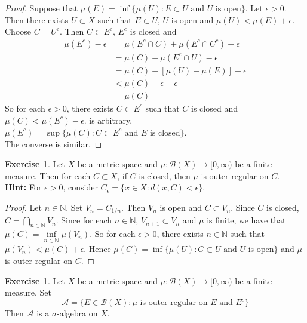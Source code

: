 \documentclass[12pt]{amsart}
\theoremstyle{definition}
\newtheorem{ex}[definition]{Exercise}
\newcommand{\ep}{\epsilon}
\newcommand{\sig}{\sigma}
\newcommand{\N}{\mathbb{N}}
\newcommand{\MA}{\mathcal{A}}
\newcommand{\MB}{\mathcal{B}}
\newcommand{\Rg}{[0,\infty)}
\begin{document}
	\begin{proof}
		Suppose that $\mu(E) = \inf  \{\mu(U): E \subset U \text{ and $U$ is open} \}$. Let $\ep >0$. Then there exists $U \subset X$ such that $E \subset U$, $U$ is open and $\mu(U) < \mu(E) + \ep$. Choose $C = U^c$. Then $C \subset E^c$, $E^c$ is closed and 
		\begin{align*}
			\mu(E^c) - \ep 
			&= \mu(E^c \cap C) + \mu(E^c \cap C^c) - \ep \\
			&= \mu(C) + \mu(E^c \cap U) - \ep \\
			&= \mu(C) + [\mu(U) - \mu(E)] - \ep \\
			&< \mu(C) + \ep - \ep \\
			&= \mu(C)
		\end{align*}
		So for each $\ep > 0$, there exists $C \subset E^c$ such that $C$ is closed and $\mu(C) < \mu(E^c) - \ep$. is arbitrary, $\mu(E^c) = \sup\{\mu(C): C \subset E^c \text{ and $E$ is closed}\}$. \\
		The converse is similar. 
	\end{proof}

	\begin{ex}
		Let $X$ be a metric space and $\mu: \MB(X) \rightarrow \Rg$ be a finite measure. Then for each $C \subset X$, if $C$ is closed, then $\mu$ is outer regular on $C$. \\
		\textbf{Hint:} For $\ep >0$, consider $C_{\ep} = \{x \in X: d(x, C) < \ep\}$. 
	\end{ex}

	\begin{proof}
		Let $n \in \N$. Set $V_n = C_{1/n}$. Then $V_n$ is open and $C \subset V_n$. Since $C$ is closed, $C = \bigcap_{n \in \N} V_n$. Since for each $n \in \N$, $V_{n+1} \subset V_n$ and $\mu$ is finite, we have that $\mu(C) = \inf\limits_{n \in \N} \mu(V_n)$. So for each $\ep >0$, there exists $n \in \N$ such that $\mu(V_n) < \mu(C) + \ep$. Hence $\mu(C) = \inf \{\mu(U): C \subset U \text{ and $U$ is open} \}$ and $\mu$ is outer regular on $C$.    
	\end{proof}
	
	\begin{ex}
		Let $X$ be a metric space and $\mu: \MB(X) \rightarrow \Rg$ be a finite measure. Set 
		$$\MA = \bigg \{E \in \MB(X): \text{$\mu$ is outer regular on $E$ and $E^c$} \bigg\}$$  
		Then $\MA$ is a $\sig$-algebra on $X$.
	\end{ex}	
\end{document}
